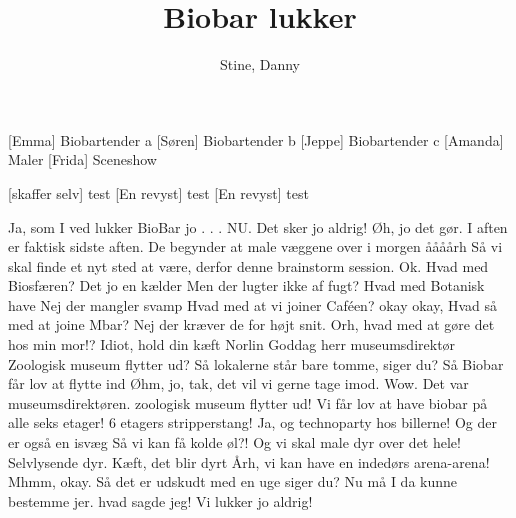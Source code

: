 \documentclass[a4paper,11pt]{article}
\title{Biobar lukker}
\author{Stine, Danny}
\begin{document}
\maketitle

\begin{roles}
[Emma] Biobartender a
[Søren] Biobartender b
[Jeppe] Biobartender c
[Amanda] Maler
[Frida] Sceneshow
\end{roles}

\begin{props}
[skaffer selv] test
[En revyst] test
[En revyst] test
\end{props}

\begin{sketch}
\begin{center}
\end{center}
 Ja, som I ved lukker BioBar jo . . . NU. 
 Det sker jo aldrig! 
 Øh, jo det gør. I aften er faktisk sidste aften. De begynder at male væggene over i morgen
 åååårh 
 Så vi skal finde et nyt sted at være, derfor denne brainstorm session. 
 Ok. Hvad med Biosfæren? Det jo en kælder
 Men der lugter ikke af fugt?
 Hvad med Botanisk have
 Nej der mangler svamp
 Hvad med at vi joiner Caféen?
 okay okay, Hvad så med at joine Mbar?
 Nej der kræver de for højt snit.
 Orh, hvad med at gøre det hos min mor!?
 Idiot, hold din kæft Norlin
 Goddag herr museumsdirektør
Zoologisk museum flytter ud?
 Så lokalerne står bare tomme, siger du?
 Så Biobar får lov at flytte ind
 Øhm, jo, tak, det vil vi gerne tage imod. 
 Wow. Det var museumsdirektøren. zoologisk museum flytter ud! Vi får lov at have biobar på alle seks etager!
 6 etagers stripperstang!
 Ja, og technoparty hos billerne! Og der er også en isvæg
 Så vi kan få kolde øl?!
 Og vi skal male dyr over det hele! Selvlysende dyr. Kæft, det blir dyrt
  Årh, vi kan have en indedørs arena-arena!
 Mhmm, okay. Så det er udskudt med en uge siger du? Nu må I da kunne bestemme jer. 
 hvad sagde jeg! Vi lukker jo aldrig!
\end{sketch}
\end{document}

